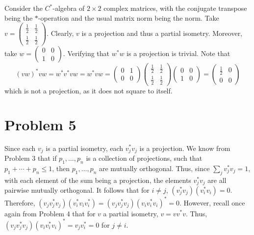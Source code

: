 \documentclass[aps,pra,showpacs,notitlepage,onecolumn,superscriptaddress,nofootinbib]{revtex4-1}
\theoremstyle{definition}
\begin{document}
Consider the $C^{*}$-algebra of $2 \times 2$ complex matrices, with the conjugate transpose being the $*$-operation and the usual matrix norm being the norm. Take $v = \begin{pmatrix} \frac{1}{2} & \frac{1}{2} \\ \frac{1}{2} & \frac{1}{2} \end{pmatrix}$.
Clearly, $v$ is a projection and thus a partial isometry. Moreover, take $w = \begin{pmatrix} 0 & 0 \\ 1 & 0 \end{pmatrix}$. Verifying that $w^{*} w$ is a projection is trivial. Note that
\begin{equation}
  (vw)^{*} vw = w^{*} v^{*} v w = w^{*} v w = \begin{pmatrix} 0 & 1 \\ 0 & 0 \end{pmatrix} \begin{pmatrix} \frac{1}{2} & \frac{1}{2} \\ \frac{1}{2} & \frac{1}{2} \end{pmatrix} \begin{pmatrix} 0 & 0 \\ 1 & 0 \end{pmatrix} = \begin{pmatrix} \frac{1}{2} & 0 \\ 0 & 0 \end{pmatrix}
\end{equation}
which is not a projection, as it does not square to itself.


\section{Problem 5}

\noindent Since each $v_j$ is a partial isometry, each $v_j^{*}  v_j$ is a projection. We know from Problem 3 that if $p_1, \dots, p_n$ is a collection of projections, such that $p_1 + \cdots + p_n \leq 1$, then
$p_1, \dots, p_n$ are mutually orthogonal. Thus, since $\sum_{j} v_j^{*} v_j = 1$, with each element of the sum being a projection, the elements $v_j^{*} v_j$ are all pairwise mutually orthogonal. It follows
that for $i \neq j$, $(v_j^{*} v_j) (v_i^{*} v_i) = 0$. Therefore, $(v_j v_j^{*} v_j)(v_i^{*} v_i v_i^{*}) = (v_j v_j^{*} v_j) (v_i v_i^{*} v_i)^{*} = 0$. However, recall once again from Problem 4 that for $v$ a partial isometry,
$v = v v^{*} v$. Thus, $(v_j v_j^{*} v_j)(v_i v_i^{*} v_i)^{*} = v_j v_i^{*} = 0$ for $j \neq i$.
\end{document}
